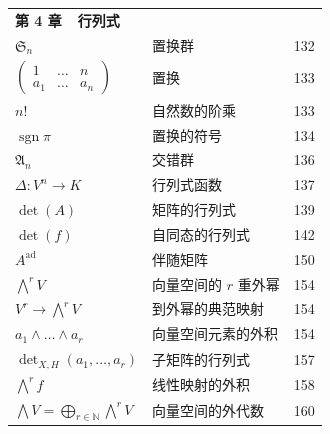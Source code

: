 \begin{longtable}{@{}l l r}
\multicolumn{3}{l}{\textbf{第 4 章\ \ 行列式}} \\[2pt]
$\mathfrak{S}_n$ & 置换群 & 132 \\
$\begin{pmatrix} 1 & \ldots & n \\ a_1 & \ldots & a_n \end{pmatrix}$ & 置换 & 133 \\
$n!$ & 自然数的阶乘 & 133 \\
$\operatorname{sgn} \pi$ & 置换的符号 & 134 \\
$\mathfrak{A}_n$ & 交错群 & 136 \\
$\Delta \colon V^n \longrightarrow K$ & 行列式函数 & 137 \\
$\det(A)$ & 矩阵的行列式 & 139 \\
$\det(f)$ & 自同态的行列式 & 142 \\
$A^{\mathrm{ad}}$ & 伴随矩阵 & 150 \\
$\bigwedge^r V$ & 向量空间的 $r$ 重外幂 & 154 \\
$V^r \longrightarrow \bigwedge^r V$ & 到外幂的典范映射 & 154 \\
$a_1 \wedge \ldots \wedge a_r$ & 向量空间元素的外积 & 154 \\
$\det_{X,H}(a_1, \ldots, a_r)$ & 子矩阵的行列式 & 157 \\
$\bigwedge^r f$ & 线性映射的外积 & 158 \\
$\bigwedge V = \bigoplus_{r \in \mathbb{N}} \bigwedge^r V$ & 向量空间的外代数 & 160 \\
\hline


\end{longtable}
